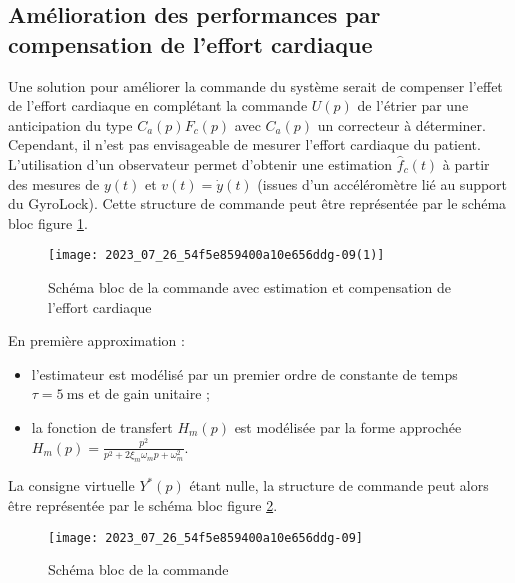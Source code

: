 \subsection{\label{sec:III.C} Amélioration des performances par compensation de l'effort cardiaque}
Une solution pour améliorer la commande du système serait de compenser l'effet de l'effort cardiaque en complétant la commande $U(p)$ de l'étrier par une anticipation du type $C_{a}(p) F_{c}(p)$ avec $C_{a}(p)$ un correcteur à déterminer. Cependant, il n'est pas envisageable de mesurer l'effort cardiaque du patient. L'utilisation d'un observateur permet d'obtenir une estimation $\hat{f}_{c}(t)$ à partir des mesures de $y(t)$ et $v(t)=\dot{y}(t)$ (issues d'un accéléromètre lié au support du GyroLock). Cette structure de commande peut être représentée par le schéma bloc figure \ref{fig:14}.

\begin{figure}[!h]
\centering
\texttt{[image: 2023\_07\_26\_54f5e859400a10e656ddg-09(1)]}
\caption{\label{fig:14}Schéma bloc de la commande avec estimation et compensation de l'effort cardiaque}
\end{figure}

En première approximation :
\begin{itemize}
\item l'estimateur est modélisé par un premier ordre de constante de temps $\tau=5 \mathrm{~ms}$ et de gain unitaire ;
  \item la fonction de transfert $H_{m}(p)$ est modélisée par la forme approchée $H_{m}(p)=\frac{p^{2}}{p^{2}+2 \xi_{m} \omega_{m} p+\omega_{m}^{2}}$.
\end{itemize}

La consigne virtuelle $Y^{*}(p)$ étant nulle, la structure de commande peut alors être représentée par le schéma bloc figure \ref{fig:15}.

\begin{figure}[!h]
\centering
\texttt{[image: 2023\_07\_26\_54f5e859400a10e656ddg-09]}
\caption{\label{fig:15}Schéma bloc de la commande}
\end{figure}



